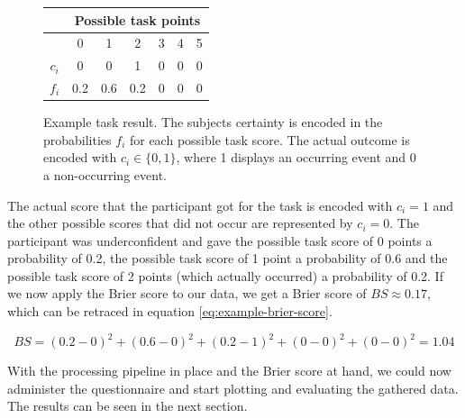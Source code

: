 \documentclass[../main/main.tex]{subfiles}
\begin{document}
	\begin{figure}[h]
		\centering
		\begin{tabular}{c|c|c|c|c|c|c|}
			& \multicolumn{6}{c|}{Possible task points} \\
			\hline
			& 0 & 1 & 2 & 3 & 4 & 5 \\
			\hline
			$c_i$ & 0 & 0 & 1 & 0 & 0 & 0 \\
			$f_i$ & 0.2 & 0.6 & 0.2 & 0 & 0 & 0\\
		\end{tabular}
		\caption{Example task result. The subjects certainty is encoded in the probabilities $f_i$ for each possible task score. The actual outcome is encoded with $c_i \in \{0, 1\}$, where 1 displays an occurring event and 0 a non-occurring event.}
		\label{fig:example}
	\end{figure}

	The actual score that the participant got for the task is encoded with $c_i = 1$ and the other possible scores that did not occur are represented by $c_i = 0$. The participant was underconfident and gave the possible task score of 0 points a probability of 0.2, the possible task score of 1 point a probability of 0.6 and the possible task score of 2 points (which actually occurred) a probability of 0.2. If we now apply the Brier score to our data, we get a Brier score of $BS \approx 0.17$, which can be retraced in equation \ref{eq:example-brier-score}.
	
	\begin{equation}
		\label{eq:example-brier-score}
		BS = (0.2 - 0)^2 + (0.6 - 0)^2 + (0.2 - 1)^2 + (0 - 0)^2 + (0 - 0)^2 = 1.04
	\end{equation}
	
	\noindent With the processing pipeline in place and the Brier score at hand, we could now administer the questionnaire and start plotting and evaluating the gathered data. The results can be seen in the next section.
\end{document}
